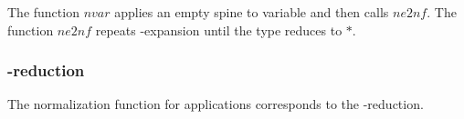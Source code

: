 The function $nvar$ applies an empty spine to variable and then calls $ne2nf$. The function $ne2nf$ repeats \eta-expansion until the type reduces to $*$.

\subsubsection*{\beta-reduction}

The normalization function for applications corresponds to the \beta-reduction.

\begin{code}[hide]%
\>[0]\<%
\end{code}

\begin{code}%
\>[0][@{}l@{\AgdaIndent{1}}]%
\>[2]\AgdaOperator{\AgdaFunction{\AgdaUnderscore{}[\AgdaUnderscore{}:=\AgdaUnderscore{}]}}\AgdaSpace{}%
\AgdaSymbol{:}\AgdaSpace{}%
\AgdaSpace{}%
\AgdaSpace{}%
\AgdaSpace{}%
\AgdaSpace{}%
\AgdaSymbol{(}\AgdaSpace{}%
\AgdaSymbol{:}\AgdaSpace{}%
\AgdaSpace{}%
\AgdaSpace{}%
\AgdaSymbol{)}\AgdaSpace{}%
\AgdaSpace{}%
\AgdaSpace{}%
\AgdaSymbol{(}\AgdaSpace{}%
\AgdaOperator{\AgdaFunction{-}}\AgdaSpace{}%
\AgdaSymbol{)}\AgdaSpace{}%
\AgdaSpace{}%
\AgdaSpace{}%
\AgdaSpace{}%
\AgdaSymbol{(}\AgdaSpace{}%
\AgdaOperator{\AgdaFunction{-}}\AgdaSpace{}%
\AgdaSymbol{)}\AgdaSpace{}%
\<%
\\
%
\>[2]\AgdaSpace{}%
\AgdaSpace{}%
\AgdaOperator{\AgdaFunction{[}}\AgdaSpace{}%
\AgdaSpace{}%
\AgdaOperator{\AgdaFunction{:=}}\AgdaSpace{}%
\AgdaSpace{}%
\AgdaOperator{\AgdaFunction{]}}\AgdaSpace{}%
\AgdaSymbol{=}\AgdaSpace{}%
\AgdaSpace{}%
\AgdaSymbol{(}\AgdaSpace{}%
\AgdaOperator{\AgdaFunction{[}}\AgdaSpace{}%
\AgdaSpace{}%
\AgdaSpace{}%
\AgdaOperator{\AgdaFunction{:=}}\AgdaSpace{}%
\AgdaSpace{}%
\AgdaSpace{}%
\AgdaSpace{}%
\AgdaOperator{\AgdaFunction{]}}\AgdaSymbol{)}\<%
\\
%
\>[2]\AgdaSpace{}%
\AgdaSymbol{\{}\AgdaSymbol{\}}\AgdaSpace{}%
\AgdaSymbol{(}\AgdaSpace{}%

\end{code}
